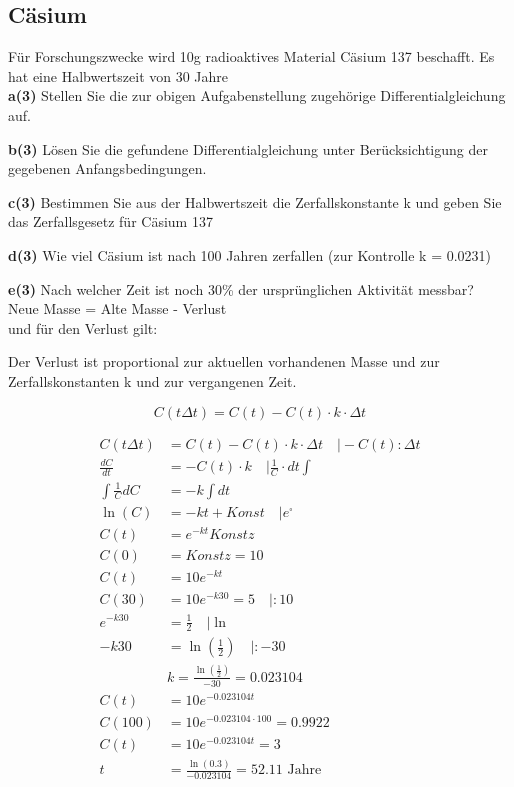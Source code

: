 \documentclass[a4paper, ngerman, 11pt]{scrarticle}
\begin{document}
	\subsection*{Cäsium}
	
	Für Forschungszwecke wird 10g radioaktives Material Cäsium 137 beschafft. Es hat eine Halbwertszeit von 30 Jahre
	\\
	
	\textbf{a(3)} Stellen Sie die zur obigen Aufgabenstellung zugehörige Differentialgleichung auf.
	
	\textbf{b(3)} Lösen Sie die gefundene Differentialgleichung unter Berücksichtigung der gegebenen Anfangsbedingungen.
	
	\textbf{c(3)} Bestimmen Sie aus der Halbwertszeit die Zerfallskonstante k und geben Sie das Zerfallsgesetz für Cäsium 137 
	
	\textbf{d(3)} Wie viel Cäsium ist nach 100 Jahren zerfallen (zur Kontrolle k = 0.0231)
	
	\textbf{e(3)} Nach welcher Zeit ist noch 30\% der ursprünglichen Aktivität messbar?
	\\
	
	Neue Masse = Alte Masse - Verlust
	\\
	
	und für den Verlust gilt:
	
	Der Verlust ist proportional zur aktuellen vorhandenen Masse und zur Zerfallskonstanten k und zur vergangenen Zeit.
	
	$$C(t \Delta t) = C(t) - C(t)\cdot k \cdot \Delta t$$
	
	
	\begin{align*}
		C(t \Delta t) &= C(t) - C(t)\cdot k \cdot \Delta t \quad  \vert - C(t) : \Delta t\\
		\frac{dC}{dt} &= - C(t)\cdot k \quad \vert \frac{1}{C} \cdot dt \int\\
		\int \frac{1}{C} dC&= -k \int dt\\
		\ln(C) &= -kt + Konst \quad \vert e^\square\\
		C(t) &= e^{-kt} Konstz\\
		C(0) &= Konstz = 10\\
		C(t) &= 10e^{-kt}\\
		C(30) &= 10e^{-k30} = 5 \quad \vert :10\\
		e^{-k30} &= \frac{1}{2} \quad \vert \ln\\
		-k30 &= \ln(\frac{1}{2}) \quad \vert :-30\\
		& k = \frac{\ln(\frac{1}{2})}{-30} = 0.023104 \\
		C(t) &= 10e^{-0.023104t}\\
		C(100) &= 10e^{-0.023104\cdot 100} = 0.9922\\
		C(t) &= 10e^{-0.023104t} = 3\\
		t &= \frac{\ln(0.3)}{-0.023104} = 52.11\text{ Jahre}\\
	\end{align*}
	 
\end{document}
